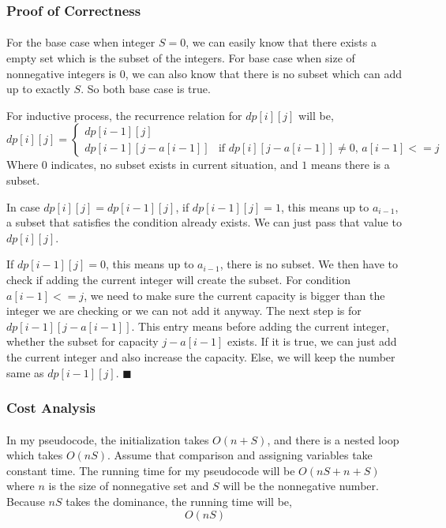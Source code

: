 \documentclass{article}
\begin{document}
\subsubsection*{Proof of Correctness}
\paragraph{}

For the base case when integer $S=0$, we can easily know that there exists a empty set which is the 
subset of the integers. For base case when size of nonnegative integers is $0$, we can also know that 
there is no subset which can add up to exactly $S$. So both base case is true.


For inductive process, the recurrence relation for $dp[i][j]$ will be,
$$dp[i][j] = \begin{cases}
  dp[i-1][j]\\
  dp[i-1][j-a[i-1]] & \text{if } dp[i][j-a[i-1]] \neq 0 \text{, } a[i-1] <= j
\end{cases}$$
Where $0$ indicates, no subset exists in current situation, and $1$ means there is a subset.


In case $dp[i][j] = dp[i-1][j]$, if $dp[i-1][j] = 1$, this means up to $a_{i-1}$,
a subset that satisfies the condition already exists. We can just pass that value to $dp[i][j]$.

If $dp[i-1][j] = 0$, this means up to $a_{i-1}$, there is no subset. We then have to check if adding
the current integer will create the subset. For condition $a[i-1] <= j$, we need to make sure the current
capacity is bigger than the integer we are checking or we can not add it anyway. The next step is for
$dp[i-1][j - a[i-1]]$. This entry means before adding the current integer, whether the subset for capacity $j-a[i-1]$ exists.
If it is true, we can just add the current integer and also increase the capacity.
Else, we will keep the number same as $dp[i-1][j]$. $\blacksquare$

\subsubsection*{Cost Analysis}
\paragraph{}
In my pseudocode, the initialization takes $O(n+S)$, and there is a nested loop which takes $O(nS)$.
Assume that comparison and assigning variables take constant time. The running time for my pseudocode will be $O(nS + n + S)$ where $n$ is the size of nonnegative set and
$S$ will be the nonnegative number. Because $nS$ takes the dominance, the running time will be,
$$O(nS)$$
\end{document}
